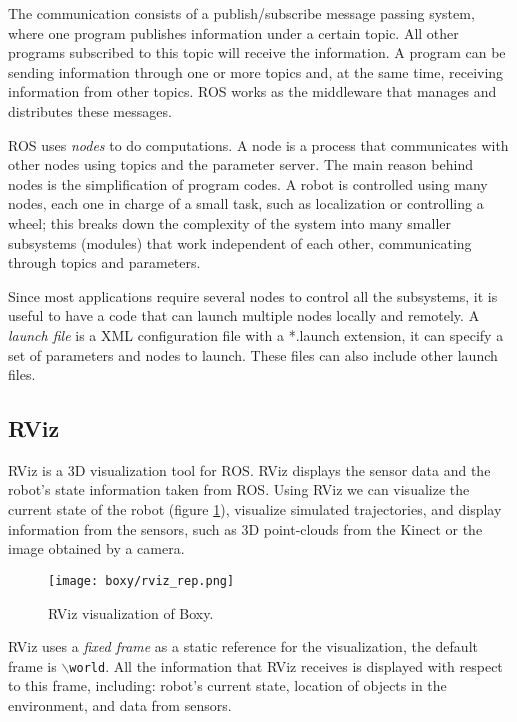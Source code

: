 The communication consists of a publish/subscribe message passing system, where one program publishes information under a certain topic. All other programs subscribed to this topic will receive the information. A program can be sending information through one or more topics and, at the same time, receiving information from other topics. ROS works as the middleware that manages and distributes these messages.

ROS uses \textit{nodes} to do computations. A node is a process that communicates with other nodes using topics and the parameter server. The main reason behind nodes is the simplification of program codes. A robot is controlled using many nodes, each one in charge of a small task, such as localization or controlling a wheel; this breaks down the complexity of the system into many smaller subsystems (modules) that work independent of each other, communicating through topics and parameters.

Since most applications require several nodes to control all the subsystems, it is useful to have a code that can launch multiple nodes locally and remotely. A \textit{launch file} is a XML configuration file with a *.launch extension, it can specify a set of parameters and nodes to launch. These files can also include other launch files. 


\subsection{RViz}
\label{subsec:rviz}

RViz is a 3D visualization tool for ROS. RViz displays the sensor data and the robot's state information taken from ROS. Using RViz we can visualize the current state of the robot (figure \ref{fig:rviz}), visualize simulated trajectories, and display information from the sensors, such as 3D point-clouds from the Kinect or the image obtained by a camera.

\begin{figure}[H]
	\centering
	\texttt{[image: boxy/rviz\_rep.png]}
	\vspace{-10pt}
	\caption{RViz visualization of Boxy.}
	\vspace{-15pt}
	\label{fig:rviz}
\end{figure}

RViz uses a \textit{fixed frame} as a static reference for the visualization, the default frame is  \texttt{$\backslash$world}. All the information that RViz receives is displayed with respect to this frame, including: robot's current state, location of objects in the environment, and data from sensors.

